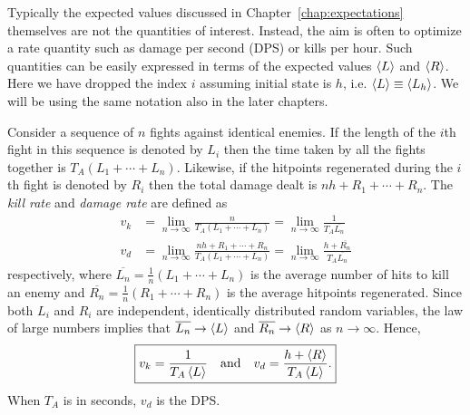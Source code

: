 Typically the expected values discussed in Chapter~\ref{chap:expectations} themselves are not the quantities of interest. Instead, the aim is often to optimize a rate quantity such as damage per second (DPS) or kills per hour. Such quantities can be easily expressed in terms of the expected values $\left\langle L \right\rangle$ and $\left\langle R \right\rangle$. Here we have dropped the index $i$ assuming initial state is $h$, i.e. $\left\langle L \right\rangle \equiv \left\langle L_h \right\rangle$. We will be using the same notation also in the later chapters.

Consider a sequence of $n$ fights against identical enemies. If the length of the $i$th fight in this sequence is denoted by $L_i$ then the time taken by all the fights together is $T_A(L_1+\cdots+L_n)$. Likewise, if the hitpoints regenerated during the $i$th fight is denoted by $R_i$ then the total damage dealt is $nh + R_1+\cdots+R_n$. The \emph{kill rate} and \emph{damage rate} are defined as
\begin{align}
	v_k &= \lim\limits_{n\rightarrow\infty} \frac{n}{T_A(L_1 + \cdots + L_n)}
		= \lim\limits_{n\rightarrow\infty} \frac{1}{T_A\overline{L_n}}\\
	v_d &= \lim\limits_{n\rightarrow\infty} \frac{nh+R_1+\cdots+R_n}{T_A(L_1 + \cdots + L_n)}
		= \lim\limits_{n\rightarrow\infty} \frac{h+\overline{R_n}}{T_A\overline{L_n}}
\end{align}
respectively, where $\overline{L_n} = \frac{1}{n}(L_1+\cdots+L_n)$ is the average number of hits to kill an enemy and $\overline{R_n} = \frac{1}{n}(R_1+\cdots+R_n)$ is the average hitpoints regenerated. Since both $L_i$ and $R_i$ are independent, identically distributed random variables, the law of large numbers implies that $\overline{L_n} \rightarrow \left\langle L \right\rangle$ and $\overline{R_n} \rightarrow \left\langle R \right\rangle$ as $n\rightarrow\infty$. Hence,
\begin{align}
	\boxed{v_k =
		\frac{1}{T_A\left\langle L \right\rangle} \quad\mbox{and}\quad v_d = \frac{h + \left\langle R \right\rangle}{T_A\left\langle L \right\rangle}.
	}\label{eq:rates}
\end{align}
When $T_A$ is in seconds, $v_d$ is the DPS.
